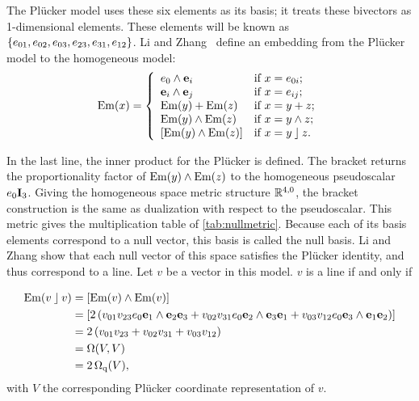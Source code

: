 The Pl\"ucker model uses these six elements as its basis; it treats these bivectors as 1-dimensional elements.  These elements will be known as $\{e_{01}, e_{02}, e_{03}, e_{23}, e_{31}, e_{12}\}$.  Li and Zhang~\cite{Hongbo} define an embedding from the Pl\"ucker model to the homogeneous model:
\begin{equation} \label{eq:Em}
  \operatorname{Em}(x) = \left\{ 
    \begin{array}{ll}
      e_0 \wedge \mathbf{e}_i &\mbox{if $x = e_{0i}$}; \\
      \mathbf{e}_i \wedge \mathbf{e}_j &\mbox{if $x = e_{ij}$}; \\
      \operatorname{Em}(y) + \operatorname{Em}(z) &\mbox{if $x = y + z$}; \\
      \operatorname{Em}(y) \wedge \operatorname{Em}(z) &\mbox{if $x = y \wedge z$}; \\
      \left[\operatorname{Em}(y) \wedge \operatorname{Em}(z)\right] &\mbox{if $x = y \mathbin{\rfloor} z$}. \\
    \end{array}
    \right.
\end{equation}

In the last line, the inner product for the Pl\"ucker is defined.  The bracket returns the proportionality factor of $\operatorname{Em}(y) \wedge \operatorname{Em}(z)$ to the homogeneous pseudoscalar $e_0\mathbf{I}_3$.  Giving the homogeneous space metric structure $\mathbb{R}^{4,0}$, the bracket construction is the same as dualization with respect to the pseudoscalar.  This metric gives the multiplication table of \autoref{tab:nullmetric}.  Because each of its basis elements correspond to a null vector, this basis is called the null basis.  Li and Zhang show that each null vector of this space satisfies the Pl\"ucker identity, and thus correspond to a line.  Let $v$ be a vector in this model.  $v$ is a line if and only if

\begin{align*}
  \operatorname{Em}(v \mathbin{\rfloor} v) &= \left[\operatorname{Em}(v) \wedge \operatorname{Em}(v)\right] \\
    &= \left[ 2 \left( v_{01} v_{23} e_0\mathbf{e}_1 \wedge \mathbf{e}_2\mathbf{e}_3 + v_{02} v_{31} e_0\mathbf{e}_2 \wedge \mathbf{e}_3\mathbf{e}_1 + v_{03} v_{12} e_0\mathbf{e}_3 \wedge \mathbf{e}_1\mathbf{e}_2 \right) \right] \\
    &= 2 \left( v_{01} v_{23} + v_{02} v_{31} + v_{03} v_{12} \right) \\
    &= \operatorname{\Omega}(V, V) \\
    &= 2 \operatorname{\Omega_q}(V),
\end{align*}
with $V$ the corresponding Pl\"ucker coordinate representation of $v$.

